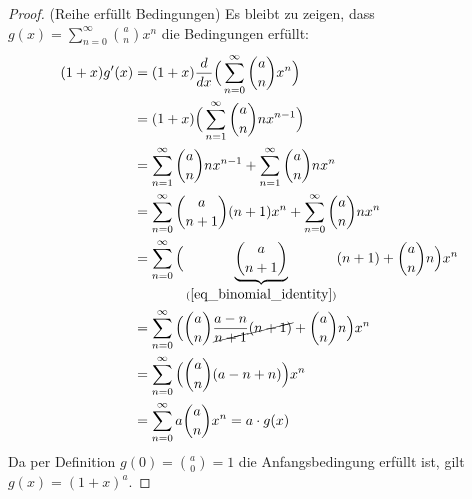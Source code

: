 \begin{example}
\begin{proof}
(Reihe erfüllt Bedingungen) Es bleibt zu zeigen, dass $g(x) = \sum_{n=0}^\infty \binom{a}{n} x^n$ die Bedingungen erfüllt:
{\allowdisplaybreaks
\begin{align*}
(1+x) g'(x) &= (1+x) \frac{d}{dx} \Big(\sum_{n=0}^\infty \binom{a}{n} x^n\Big)\\
    &= (1+x) \Big(\sum_{n=1}^\infty \binom{a}{n}n x^{n-1}\Big)\\
    &= \sum_{n=1}^\infty \binom{a}{n}n x^{n-1} + \sum_{n=1}^\infty \binom{a}{n}n x^{n}\\
    &= \sum_{n=0}^\infty \binom{a}{n+1}(n+1) x^{n} + \sum_{n=0}^\infty \binom{a}{n}n x^{n}\\
    &= \sum_{n=0}^\infty \Big( \underbrace{\binom{a}{n+1}}_{(\ref{eq_binomial_identity})}(n+1) + \binom{a}{n}n \Big) x^n\\
    &= \sum_{n=0}^\infty \Big( \binom{a}{n}\frac{a-n}{\cancel{n+1}}\cancel{(n+1)} + \binom{a}{n}n \Big) x^n\\
    &= \sum_{n=0}^\infty \Big( \binom{a}{n} (a-n+n) \Big) x^n\\
    &= \sum_{n=0}^\infty a \binom{a}{n} x^n = a \cdot g(x)
\end{align*}}
Da per Definition $g(0) = \binom{a}{0} = 1$ die Anfangsbedingung erfüllt ist, gilt $g(x) = (1+x)^a$.
\end{proof}
\end{example}
